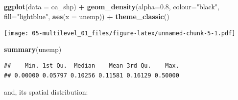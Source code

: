 \documentclass[]{book}
\newenvironment{Shaded}{\begin{snugshade}}{\end{snugshade}}
\newcommand{\KeywordTok}[1]{\textcolor[rgb]{0.13,0.29,0.53}{\textbf{#1}}}
\newcommand{\DataTypeTok}[1]{\textcolor[rgb]{0.13,0.29,0.53}{#1}}
\newcommand{\FloatTok}[1]{\textcolor[rgb]{0.00,0.00,0.81}{#1}}
\newcommand{\StringTok}[1]{\textcolor[rgb]{0.31,0.60,0.02}{#1}}
\newcommand{\OperatorTok}[1]{\textcolor[rgb]{0.81,0.36,0.00}{\textbf{#1}}}
\newcommand{\NormalTok}[1]{#1}
\begin{document}
\begin{Shaded}
\begin{Highlighting}[]
\KeywordTok{ggplot}\NormalTok{(}\DataTypeTok{data =}\NormalTok{ oa_shp) }\OperatorTok{+}
\KeywordTok{geom_density}\NormalTok{(}\DataTypeTok{alpha=}\FloatTok{0.8}\NormalTok{, }\DataTypeTok{colour=}\StringTok{"black"}\NormalTok{, }\DataTypeTok{fill=}\StringTok{"lightblue"}\NormalTok{, }\KeywordTok{aes}\NormalTok{(}\DataTypeTok{x =}\NormalTok{ unemp)) }\OperatorTok{+}
\StringTok{   }\KeywordTok{theme_classic}\NormalTok{()}
\end{Highlighting}
\end{Shaded}

\texttt{[image: 05-multilevel\_01\_files/figure-latex/unnamed-chunk-5-1.pdf]}

\begin{Shaded}
\begin{Highlighting}[]
\KeywordTok{summary}\NormalTok{(unemp)}
\end{Highlighting}
\end{Shaded}

\begin{verbatim}
##    Min. 1st Qu.  Median    Mean 3rd Qu.    Max. 
## 0.00000 0.05797 0.10256 0.11581 0.16129 0.50000
\end{verbatim}

and, its spatial distribution:
\end{document}
